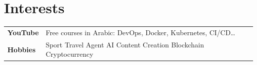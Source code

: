 \documentclass[a4paper,10pt]{article}
\begin{document}
\section{Interests}
\begin{tabularx}{\linewidth}{@{}p{3.8cm} X@{}}
  {\small\bfseries YouTube} &
  {\small Free courses in Arabic: DevOps, Docker, Kubernetes, CI/CD\ldots} \\[2pt]
  {\small\bfseries Hobbies} &
  {\small Sport \textbar{} Travel \textbar{} Agent AI \textbar{} Content Creation} \textbar{} Blockchain  \textbar{} Cryptocurrency \\
\end{tabularx}
\end{document}
